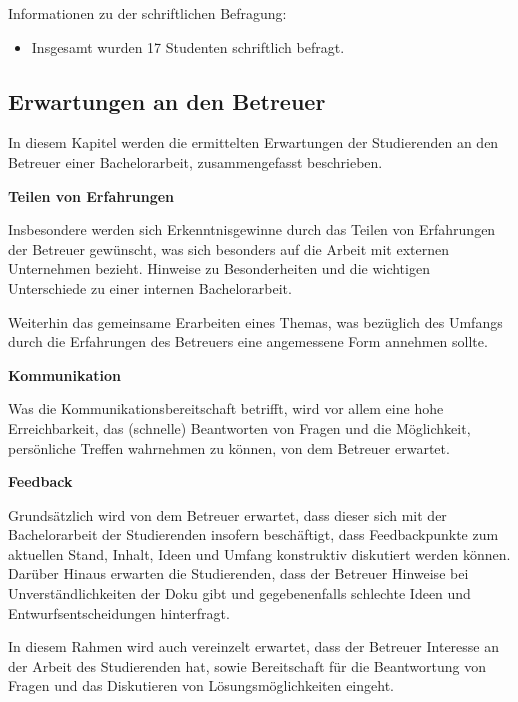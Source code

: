 \documentclass[bibliography=totoc,listof=totoc,BCOR=5mm,DIV=12,oneside]{scrbook}
\begin{document}
\label{sub:studentenchriftlichErgebnisse}
\par \bigskip Informationen zu der schriftlichen Befragung:
\begin{itemize}
\item Insgesamt wurden 17 Studenten schriftlich befragt.
\end{itemize}

\subsection{Erwartungen an den Betreuer}
\par In diesem Kapitel werden die ermittelten Erwartungen der Studierenden an den Betreuer einer Bachelorarbeit, zusammengefasst beschrieben. 

\par \bigskip \textbf{Teilen von Erfahrungen}
\par Insbesondere werden sich Erkenntnisgewinne durch das Teilen von Erfahrungen der Betreuer gewünscht, was sich besonders auf die Arbeit mit externen Unternehmen bezieht. Hinweise zu Besonderheiten und die wichtigen Unterschiede zu einer internen Bachelorarbeit. 
\par Weiterhin das gemeinsame Erarbeiten eines Themas, was bezüglich des Umfangs durch die Erfahrungen des Betreuers eine angemessene Form annehmen sollte.

\par \bigskip \textbf{Kommunikation}
\par Was die Kommunikationsbereitschaft betrifft, wird vor allem eine hohe Erreichbarkeit, das (schnelle) Beantworten von Fragen und die Möglichkeit, persönliche Treffen wahrnehmen zu können, von dem Betreuer erwartet.

\par \bigskip \textbf{Feedback}
\par Grundsätzlich wird von dem Betreuer erwartet, dass dieser sich mit der Bachelorarbeit der Studierenden insofern beschäftigt, dass Feedbackpunkte zum aktuellen Stand, Inhalt, Ideen und Umfang konstruktiv diskutiert werden können. Darüber Hinaus erwarten die Studierenden, dass der Betreuer Hinweise bei Unverständlichkeiten der Doku gibt und gegebenenfalls schlechte Ideen und Entwurfsentscheidungen hinterfragt.
\par In diesem Rahmen wird auch vereinzelt erwartet, dass der Betreuer Interesse an der Arbeit des Studierenden hat, sowie Bereitschaft für die Beantwortung von Fragen und das Diskutieren von Lösungsmöglichkeiten eingeht.
\end{document}
